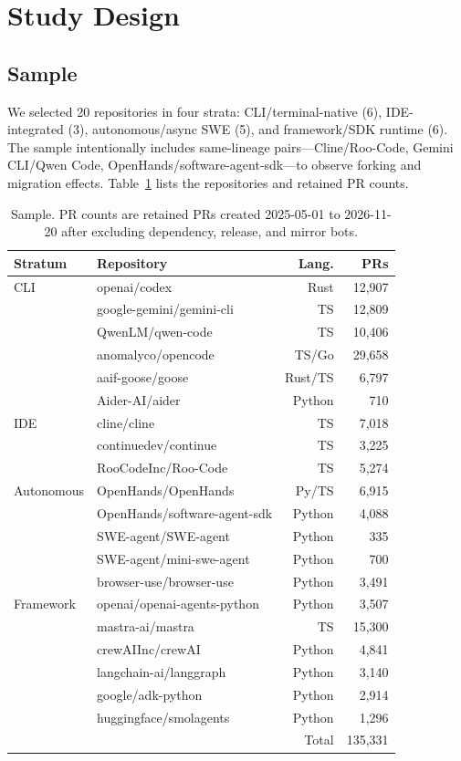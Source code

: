 \documentclass[sigconf,review]{acmart}
\begin{document}
\section{Study Design}
\label{sec:design}

\subsection{Sample}

We selected 20 repositories in four strata: CLI/terminal-native (6), IDE-integrated (3), autonomous/async SWE (5), and framework/SDK runtime (6). The sample intentionally includes same-lineage pairs---Cline/Roo-Code, Gemini CLI/Qwen Code, OpenHands/software-agent-sdk---to observe forking and migration effects. Table~\ref{tab:sample} lists the repositories and retained PR counts.

\begin{table}[t]
\centering
\small
\caption{Sample. PR counts are retained PRs created 2025-05-01 to 2026-11-20 after excluding dependency, release, and mirror bots.}
\label{tab:sample}
\begin{tabular}{@{}llrr@{}}
\toprule
Stratum & Repository & Lang. & PRs \\
\midrule
CLI & openai/codex & Rust & 12,907 \\
    & google-gemini/gemini-cli & TS & 12,809 \\
    & QwenLM/qwen-code & TS & 10,406 \\
    & anomalyco/opencode & TS/Go & 29,658 \\
    & aaif-goose/goose & Rust/TS & 6,797 \\
    & Aider-AI/aider & Python & 710 \\
\midrule
IDE & cline/cline & TS & 7,018 \\
    & continuedev/continue & TS & 3,225 \\
    & RooCodeInc/Roo-Code & TS & 5,274 \\
\midrule
Autonomous & OpenHands/OpenHands & Py/TS & 6,915 \\
    & OpenHands/software-agent-sdk & Python & 4,088 \\
    & SWE-agent/SWE-agent & Python & 335 \\
    & SWE-agent/mini-swe-agent & Python & 700 \\
    & browser-use/browser-use & Python & 3,491 \\
\midrule
Framework & openai/openai-agents-python & Python & 3,507 \\
    & mastra-ai/mastra & TS & 15,300 \\
    & crewAIInc/crewAI & Python & 4,841 \\
    & langchain-ai/langgraph & Python & 3,140 \\
    & google/adk-python & Python & 2,914 \\
    & huggingface/smolagents & Python & 1,296 \\
\midrule
\multicolumn{3}{r}{Total} & 135,331 \\
\bottomrule
\end{tabular}
\end{table}
\end{document}
